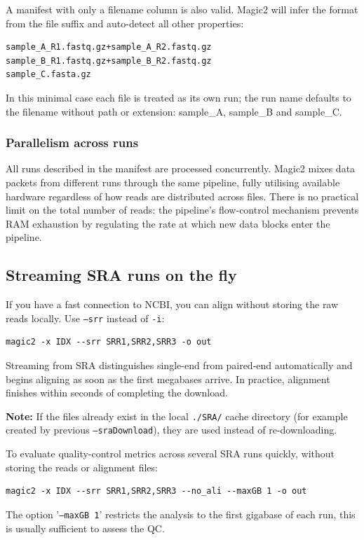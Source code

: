 \documentclass[11pt]{article}
\newcommand{\code}[1]{\texttt{#1}}
\begin{document}
A manifest with only a filename column is also valid.  Magic2 will infer the
format from the file suffix and auto-detect all other properties:

\begin{lstlisting}
sample_A_R1.fastq.gz+sample_A_R2.fastq.gz
sample_B_R1.fastq.gz+sample_B_R2.fastq.gz
sample_C.fasta.gz
\end{lstlisting}

In this minimal case each file is treated as its own run; the run name
defaults to the filename without path or extension: sample\_A, sample\_B and sample\_C.

\subsubsection{Parallelism across runs}

All runs described in the manifest are processed concurrently.
Magic2 mixes data packets from different runs through the same pipeline,
fully utilising available hardware regardless of how reads are distributed
across files.  There is no practical limit on the total number of reads:
the pipeline's flow-control mechanism prevents RAM exhaustion by
regulating the rate at which new data blocks enter the pipeline.

\subsection{Streaming SRA runs on the fly}

If you have a fast connection to NCBI, you can align without storing the
raw reads locally.  Use \code{--srr} instead of \code{-i}:
\begin{lstlisting}
magic2 -x IDX --srr SRR1,SRR2,SRR3 -o out
\end{lstlisting}

Streaming from SRA distinguishes single-end from paired-end automatically and begins
aligning as soon as the first megabases arrive.  In practice, alignment
finishes within seconds of completing the download.

\begin{notebox}
\textbf{Note:} If the files already exist in the local \code{./SRA/}
cache directory (for example created by previous \code{--sraDownload}), they are used
instead of re-downloading.
\end{notebox}

To evaluate quality-control metrics across several SRA runs quickly,
without storing the reads or alignment files:
\begin{lstlisting}
magic2 -x IDX --srr SRR1,SRR2,SRR3 --no_ali --maxGB 1 -o out
\end{lstlisting}
The option '\code{--maxGB 1}' restricts the analysis to the first gigabase of each run,
this is usually sufficient to assess the QC.
\end{document}
